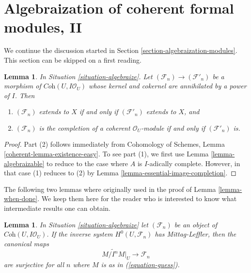 \documentclass{stacks-project}
\theoremstyle{plain}
\newtheorem{lemma}[subsection]{Lemma}
\theoremstyle{definition}
\theoremstyle{remark}
\numberwithin{equation}{subsection}
\begin{document}
\section{Algebraization of coherent formal modules, II}
\label{section-algebraization-modules-general}

\noindent
We continue the discussion started in
Section \ref{section-algebraization-modules}.
This section can be skipped on a first reading.

\begin{lemma}
\label{lemma-map-kernel-cokernel-on-closed}
In Situation \ref{situation-algebraize}. Let
$(\mathcal{F}_n) \to (\mathcal{F}'_n)$ be a morphism of
$\textit{Coh}(U, I\mathcal{O}_U)$
whose kernel and cokernel are annihilated by a power of $I$. Then
\begin{enumerate}
\item $(\mathcal{F}_n)$ extends to $X$ if and only if
$(\mathcal{F}'_n)$ extends to $X$, and
\item $(\mathcal{F}_n)$ is the completion of a coherent $\mathcal{O}_U$-module
if and only if $(\mathcal{F}'_n)$ is.
\end{enumerate}
\end{lemma}

\begin{proof}
Part (2) follows immediately from
Cohomology of Schemes, Lemma \ref{coherent-lemma-existence-easy}.
To see part (1), we first use Lemma \ref{lemma-algebraizable}
to reduce to the case where $A$ is $I$-adically complete.
However, in that case (1) reduces to (2) by
Lemma \ref{lemma-essential-image-completion}.
\end{proof}

\noindent
The following two lemmas where originally used in the proof
of Lemma \ref{lemma-when-done}. We keep them here for the reader who is
interested to know what intermediate results one can obtain.

\begin{lemma}
\label{lemma-when-ML}
In Situation \ref{situation-algebraize} let $(\mathcal{F}_n)$ be an object
of $\textit{Coh}(U, I\mathcal{O}_U)$. If the inverse system
$H^0(U, \mathcal{F}_n)$ has Mittag-Leffler, then the canonical maps
$$
\widetilde{M/I^nM}|_U \to \mathcal{F}_n
$$
are surjective for all $n$ where $M$ is as in (\ref{equation-guess}).
\end{lemma}
\end{document}

